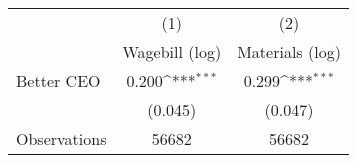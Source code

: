 {
\def\sym#1{\ifmmode^{#1}\else\(^{#1}\)\fi}
\begin{tabular}{l*{2}{c}}
\hline\hline
                    &\multicolumn{1}{c}{(1)}&\multicolumn{1}{c}{(2)}\\
                    &\multicolumn{1}{c}{Wagebill (log)}&\multicolumn{1}{c}{Materials (log)}\\
\hline
Better CEO          &       0.200\sym{***}&       0.299\sym{***}\\
                    &     (0.045)         &     (0.047)         \\
\hline
Observations        &       56682         &       56682         \\
\hline\hline
\end{tabular}
}
